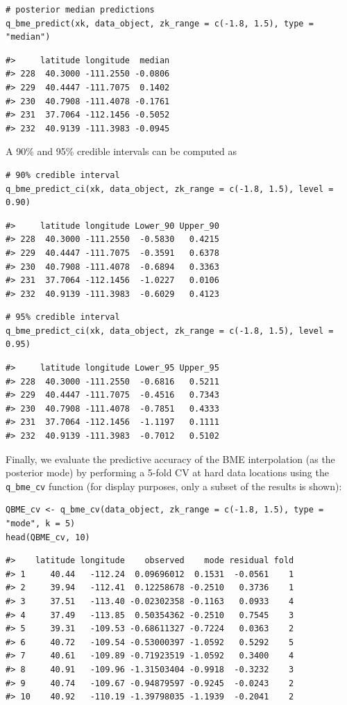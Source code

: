\begin{verbatim}
# posterior median predictions
q_bme_predict(xk, data_object, zk_range = c(-1.8, 1.5), type = "median")
\end{verbatim}

\begin{verbatim}
#>     latitude longitude  median
#> 228  40.3000 -111.2550 -0.0806
#> 229  40.4447 -111.7075  0.1402
#> 230  40.7908 -111.4078 -0.1761
#> 231  37.7064 -112.1456 -0.5052
#> 232  40.9139 -111.3983 -0.0945
\end{verbatim}

A 90\% and 95\% credible intervals can be computed as

\begin{verbatim}
# 90% credible interval
q_bme_predict_ci(xk, data_object, zk_range = c(-1.8, 1.5), level = 0.90)
\end{verbatim}

\begin{verbatim}
#>     latitude longitude Lower_90 Upper_90
#> 228  40.3000 -111.2550  -0.5830   0.4215
#> 229  40.4447 -111.7075  -0.3591   0.6378
#> 230  40.7908 -111.4078  -0.6894   0.3363
#> 231  37.7064 -112.1456  -1.0227   0.0106
#> 232  40.9139 -111.3983  -0.6029   0.4123
\end{verbatim}

\begin{verbatim}
# 95% credible interval
q_bme_predict_ci(xk, data_object, zk_range = c(-1.8, 1.5), level = 0.95)
\end{verbatim}

\begin{verbatim}
#>     latitude longitude Lower_95 Upper_95
#> 228  40.3000 -111.2550  -0.6816   0.5211
#> 229  40.4447 -111.7075  -0.4516   0.7343
#> 230  40.7908 -111.4078  -0.7851   0.4333
#> 231  37.7064 -112.1456  -1.1197   0.1111
#> 232  40.9139 -111.3983  -0.7012   0.5102
\end{verbatim}

Finally, we evaluate the predictive accuracy of the BME interpolation (as the posterior mode) by performing a 5-fold CV at hard data locations using the \texttt{q\_bme\_cv} function (for display purposes, only a subset of the results is shown):

\begin{verbatim}
QBME_cv <- q_bme_cv(data_object, zk_range = c(-1.8, 1.5), type = "mode", k = 5)
head(QBME_cv, 10)
\end{verbatim}

\begin{verbatim}
#>    latitude longitude    observed    mode residual fold
#> 1     40.44   -112.24  0.09696012  0.1531  -0.0561    1
#> 2     39.94   -112.41  0.12258678 -0.2510   0.3736    1
#> 3     37.51   -113.40 -0.02302358 -0.1163   0.0933    4
#> 4     37.49   -113.85  0.50354362 -0.2510   0.7545    3
#> 5     39.31   -109.53 -0.68611327 -0.7224   0.0363    2
#> 6     40.72   -109.54 -0.53000397 -1.0592   0.5292    5
#> 7     40.61   -109.89 -0.71923519 -1.0592   0.3400    4
#> 8     40.91   -109.96 -1.31503404 -0.9918  -0.3232    3
#> 9     40.74   -109.67 -0.94879597 -0.9245  -0.0243    2
#> 10    40.92   -110.19 -1.39798035 -1.1939  -0.2041    2
\end{verbatim}

